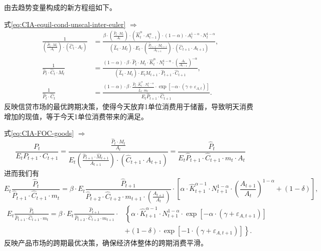 由去趋势变量构成的新方程组如下。

式\eqref{eq:CIA-equil-cond-unscal-inter-euler} $\Rightarrow$
\begin{align}
  \frac{1}{\left(\frac{\hat{P}_t \cdot M_{t}}{A_t}\right) \cdot \left(\hat{C}_t \cdot A_t \right)} &=
  \frac{
  \beta \cdot \left(\frac{\hat{P}_t \cdot M_t}{A_t}\right) \cdot \left(\hat{K}_t^{\alpha} \cdot A_{t-1}^{\alpha} \right) \cdot (1-\alpha) \cdot A_t^{1-\alpha} \cdot N_t^{1-\alpha}
  }{
  \left(\hat{L}_t \cdot M_t \right) \cdot E_t \cdot \left(\frac{\hat{P}_{t+1} \cdot M_{t+1}}{A_{t+1}}\right) \cdot \left( \hat{C}_{t+1} \cdot A_{t+1} \right)
  },
  \nonumber \\
  \frac{1}{\hat{P}_t \cdot \hat{C}_t \cdot M_t} &= \frac{
  (1-\alpha) \cdot \beta \cdot \hat{P}_t \cdot M_t \cdot \hat{K}_t^{\alpha} \cdot N_t^{1-\alpha} \cdot \left(\frac{A_t}{A_{t-1}}\right)^{-\alpha}
  }{
  \left(\hat{L}_t \cdot M_t\right) \cdot E_t M_{t+1} \cdot \hat{P}_{t+1} \cdot \hat{C}_{t+1}
  },\nonumber \\
  \label{eq:CIA-equil-cond-scal-inter-euler}
  \frac{1}{\hat{P}_t \cdot \hat{C}_t} &=  \frac{
  (1-\alpha)\cdot \beta \cdot \frac{\hat{P}_t \cdot \hat{K}_t^{\alpha} \cdot N_t^{1-\alpha}}{\hat{L}_t \cdot m_t} \cdot \exp \left[ - \alpha \cdot \left( \gamma + \varepsilon_{A,t} \right)\right]
  }{
  E_t \hat{P}_{t+1} \cdot \hat{C}_{t+1}
  }.
\end{align}
反映信贷市场的最优跨期决策，使得今天放弃1单位消费用于储蓄，导致明天消费增加的现值，等于今天1单位消费带来的满足。

式\eqref{eq:CIA-FOC-goods} $\Rightarrow$
\begin{equation*}
  \frac{P_t}{E_t P_{t+1}\cdot C_{t+1}}
  = \frac{
  \frac{\hat{P}_t \cdot M_t }{A_t}
  }{
  E_t \left(
   \frac{\hat{P}_{t+1} \cdot \hat{M}_{t+1}}{A_{t+1}}
  \right) \cdot \left(
  \hat{C}_{t+1} \cdot A_{t+1}
  \right)
  }
  =\frac{\hat{P}_t}{E_t \hat{P}_{t+1} \cdot \hat{C}_{t+1} \cdot m_t \cdot A_t}
\end{equation*}
进而我们有
\begin{equation*}
  E_t \frac{\hat{P}_t}{\hat{P}_{t+1} \cdot \hat{C}_{t+1} \cdot m_t} = \beta \cdot E_t \frac{\hat{P}_{t+1}}{\hat{P}_{t+2} \cdot \hat{C}_{t+2} \cdot m_{t+1} \cdot \left(\frac{A_{t+1}}{A_t}\right)} \cdot \left[
  \alpha \cdot \hat{K}_{t+1}^{\alpha-1} \cdot N_{t+1}^{1-\alpha} \cdot
  \left(\frac{A_{t+1}}{A_t}\right)^{1-\alpha} + \left( 1-\delta \right)
  \right],
\end{equation*}
\begin{align}
  \label{eq:CIA-FOC-goods-scal}
 E_t \frac{\hat{P}_t}{\hat{P}_{t+1} \cdot \hat{C}_{t+1} \cdot m_t} = \beta \cdot E_t \frac{
 \hat{P}_{t+1}
 }{
 \hat{P}_{t+2} \cdot \hat{C}_{t+2} \cdot m_{t+1}
 } \cdot & \left\{
\alpha \cdot \hat{K}_{t+1}^{\alpha -1} \cdot N_{t+1}^{ 1-\alpha} \cdot \exp \left[-\alpha \cdot \left(\gamma + \varepsilon_{A,t+1}\right)\right] \right.\nonumber \\
& \left. + \left( 1-\delta \right) \cdot \exp \left[ -1 \cdot \left( \gamma + \varepsilon_{A,t+1} \right) \right] \right\}.
\end{align}
反映产品市场的跨期最优决策，确保经济体整体的跨期消费平滑。

